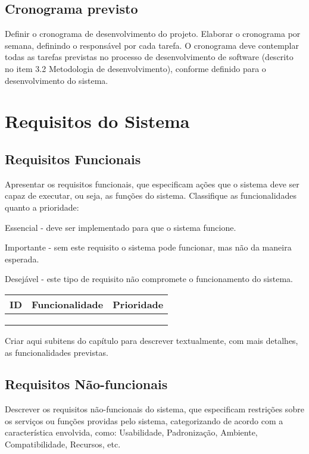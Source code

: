 \documentclass[a4paper,12pt]{article}
\begin{document}
\subsection{Cronograma previsto}
Definir o cronograma de desenvolvimento do projeto. Elaborar o cronograma por semana, definindo o responsável por cada tarefa. O cronograma deve contemplar todas as tarefas previstas no processo de desenvolvimento de software (descrito no item 3.2 Metodologia de desenvolvimento), conforme definido para o desenvolvimento do sistema.

\newpage
\section{Requisitos do Sistema}
\subsection{Requisitos Funcionais}

Apresentar os requisitos funcionais, que especificam ações que o sistema deve ser capaz de executar, ou seja, as funções do sistema. Classifique as funcionalidades quanto a prioridade:

Essencial - deve ser implementado para que o sistema funcione.

Importante - sem este requisito o sistema pode funcionar, mas não da maneira esperada.

Desejável - este tipo de requisito não compromete o funcionamento do sistema.

\begin{longtable}{|c|p{10cm}|c|}
    \hline
    \textbf{ID} & \textbf{Funcionalidade} & \textbf{Prioridade} \\
    \hline
     &  &  \\
    \hline
     &  &  \\
    \hline
     &  &  \\
    \hline
\end{longtable}

Criar aqui subitens do capítulo para descrever textualmente, com mais detalhes, as funcionalidades previstas.

\subsection{Requisitos Não-funcionais}
Descrever os requisitos não-funcionais do sistema, que especificam restrições sobre os serviços ou funções providas pelo sistema, categorizando de acordo com a característica envolvida, como: Usabilidade, Padronização, Ambiente, Compatibilidade, Recursos, etc.
\end{document}
